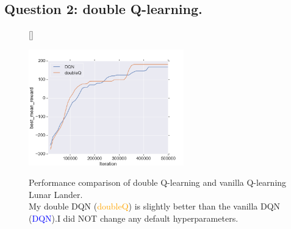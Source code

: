 \documentclass[12pt]{article}
\newcounter{question}
\begin{document}
	\subsection{Question 2: double Q-learning.}
	\begin{figure}[!htbp] 
		[\FBwidth]
		{\caption[caption]{
				Performance comparison of double Q-learning and vanilla Q-learning Lunar Lander.\\ \hspace{0.4\textwidth}
				My double DQN (\textcolor{orange}{doubleQ}) is slightly better than the vanilla DQN (\textcolor{blue}{DQN}).I did NOT change any default hyperparameters.
			}\label{fig:DDQN}}
		{\includegraphics[width=0.6\textwidth]{question1_2.png}}
	\end{figure}
	\pagebreak
\end{document}
